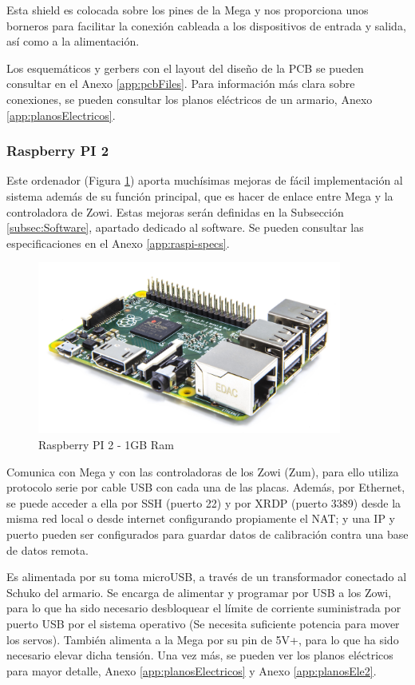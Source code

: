 Esta shield es colocada sobre los pines de la Mega y nos proporciona unos borneros para facilitar la conexión cableada a los dispositivos de entrada y salida, así como a la alimentación.

Los esquemáticos y gerbers con el layout del diseño de la PCB se pueden consultar en el Anexo \ref{app:pcbFiles}. Para información más clara sobre conexiones, se pueden consultar los planos eléctricos de un armario, Anexo \ref{app:planosElectricos}.

\subsubsection{Raspberry PI 2}

Este ordenador (Figura \ref{fig:raspi}) aporta muchísimas mejoras de fácil implementación al sistema además de su función principal, que es hacer de enlace entre Mega y la controladora de Zowi. Estas mejoras serán definidas en la Subsección \ref{subsec:Software}, apartado dedicado al software. Se pueden consultar las especificaciones en el Anexo \ref{app:raspi-specs}.

\begin{figure}
\centering
\includegraphics[width=100mm]{Figures/raspi}
\caption{Raspberry PI 2 - 1GB Ram}
\label{fig:raspi}
\end{figure}

Comunica con Mega y con las controladoras de los Zowi (Zum), para ello utiliza protocolo serie por cable USB con cada una de las placas. Además, por Ethernet, se puede acceder a ella por SSH (puerto 22) y por XRDP (puerto 3389) desde la misma red local o desde internet configurando propiamente el NAT; y una IP y puerto pueden ser configurados para guardar datos de calibración contra una base de datos remota.

Es alimentada por su toma microUSB, a través de un transformador conectado al Schuko del armario. Se encarga de alimentar y programar por USB a los Zowi, para lo que ha sido necesario desbloquear el límite de corriente suministrada por puerto USB por el sistema operativo (Se necesita suficiente potencia para mover los servos). También alimenta a la Mega por su pin de 5V+, para lo que ha sido necesario elevar dicha tensión. Una vez más, se pueden ver los planos eléctricos para mayor detalle, Anexo \ref{app:planosElectricos} y Anexo \ref{app:planosEle2}.

